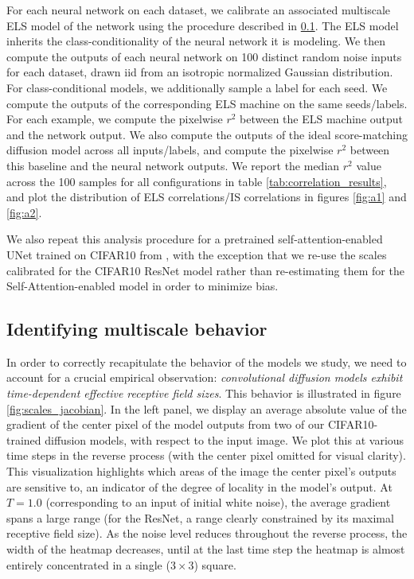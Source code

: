 \documentclass{article}
\theoremstyle{plain}
\theoremstyle{definition}
\theoremstyle{remark}
\begin{document}
For each neural network on each dataset, we calibrate an associated multiscale ELS model of the network using the procedure described in \ref{sec:multiscale}. The ELS model inherits the class-conditionality of the neural network it is modeling. We then compute the outputs of each neural network on 100 distinct random noise inputs for each dataset, drawn iid from an isotropic normalized Gaussian distribution. For class-conditional models, we additionally sample a label for each seed. We compute the outputs of the corresponding ELS machine on the same seeds/labels. For each example, we compute the pixelwise $r^2$ between the ELS machine output and the network output. We also compute the outputs of the ideal score-matching diffusion model across all inputs/labels, and compute the pixelwise $r^2$ between this baseline and the neural network outputs. We report the median $r^2$ value across the 100 samples for all configurations in table \ref{tab:correlation_results}, and plot the distribution of ELS correlations/IS correlations in figures \ref{fig:a1} and \ref{fig:a2}.

We also repeat this analysis procedure for a pretrained self-attention-enabled UNet trained on CIFAR10 from \cite{VSehwag_minimal_diffusion}, with the exception that we re-use the scales calibrated for the CIFAR10 ResNet model rather than re-estimating them for the Self-Attention-enabled model in order to minimize bias. 

\subsection{Identifying multiscale behavior}\label{sec:multiscale}

In order to correctly recapitulate the behavior of the models we study, we need to account for a crucial empirical observation: \textit{convolutional diffusion models exhibit time-dependent effective receptive field sizes}. This behavior is illustrated in figure \ref{fig:scales_jacobian}. In the left panel, we display an average absolute value of the  gradient of the center pixel of the model outputs from two of our CIFAR10-trained diffusion models, with respect to the input image. We plot this at various time steps in the reverse process (with the center pixel omitted for visual clarity). This visualization highlights which areas of the image the center pixel's outputs are sensitive to, an indicator of the degree of locality in the model's output. At $T = 1.0$ (corresponding to an input of initial white noise), the average gradient spans a large range (for the ResNet, a range clearly constrained by its maximal receptive field size). As the noise level reduces throughout the reverse process, the width of the heatmap decreases, until at the last time step the heatmap is almost entirely concentrated in a single ($3 \times 3$) square.
\end{document}
